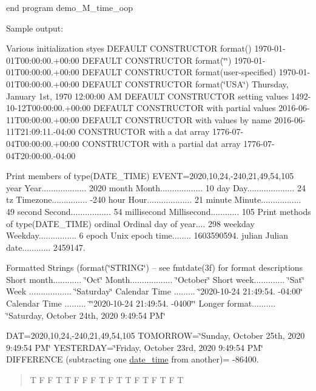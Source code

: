 end program demo\+\_\+\+M\+\_\+time\+\_\+oop

Sample output\+:

Various initialization styes D\+E\+F\+A\+U\+LT C\+O\+N\+S\+T\+R\+U\+C\+T\+OR format() 1970-\/01-\/01\+T00\+:00\+:00.+00\+:00 D\+E\+F\+A\+U\+LT C\+O\+N\+S\+T\+R\+U\+C\+T\+OR format(\char`\"{}\char`\"{}) 1970-\/01-\/01\+T00\+:00\+:00.+00\+:00 D\+E\+F\+A\+U\+LT C\+O\+N\+S\+T\+R\+U\+C\+T\+OR format(user-\/specified) 1970-\/01-\/01\+T00\+:00\+:00.+00\+:00 D\+E\+F\+A\+U\+LT C\+O\+N\+S\+T\+R\+U\+C\+T\+OR format(\char`\"{}\+U\+S\+A\char`\"{}) Thursday, January 1st, 1970 12\+:00\+:00 AM D\+E\+F\+A\+U\+LT C\+O\+N\+S\+T\+R\+U\+C\+T\+OR setting values 1492-\/10-\/12\+T00\+:00\+:00.+00\+:00 D\+E\+F\+A\+U\+LT C\+O\+N\+S\+T\+R\+U\+C\+T\+OR with partial values 2016-\/06-\/11\+T00\+:00\+:00.+00\+:00 D\+E\+F\+A\+U\+LT C\+O\+N\+S\+T\+R\+U\+C\+T\+OR with values by name 2016-\/06-\/11\+T21\+:09\+:11.-\/04\+:00 C\+O\+N\+S\+T\+R\+U\+C\+T\+OR with a dat array 1776-\/07-\/04\+T00\+:00\+:00.+00\+:00 C\+O\+N\+S\+T\+R\+U\+C\+T\+OR with a partial dat array 1776-\/07-\/04\+T20\+:00\+:00.-\/04\+:00

Print members of type(\+D\+A\+T\+E\+\_\+\+T\+I\+M\+E) E\+V\+E\+NT=2020,10,24,-\/240,21,49,54,105 year Year................... 2020 month Month.................. 10 day Day.................... 24 tz Timezone............... -\/240 hour Hour................... 21 minute Minute................. 49 second Second................. 54 millisecond Millisecond............ 105 Print methods of type(\+D\+A\+T\+E\+\_\+\+T\+I\+M\+E) ordinal Ordinal day of year.... 298 weekday Weekday................ 6 epoch Unix epoch time........ 1603590594. julian Julian date............ 2459147.

Formatted Strings (format(\char`\"{}\+S\+T\+R\+I\+N\+G\char`\"{}) -- see fmtdate(3f) for format descriptions Short month............ \char`\"{}\+Oct\char`\"{} Month.................. \char`\"{}\+October\char`\"{} Short week............. \char`\"{}\+Sat\char`\"{} Week .................. \char`\"{}\+Saturday\char`\"{} Calendar Time ......... \char`\"{}2020-\/10-\/24 21\+:49\+:54. -\/04\+:00\char`\"{} Calendar Time ......... \char`\"{}\char`\"{}2020-\/10-\/24 21\+:49\+:54. -\/0400\char`\"{}\char`\"{} Longer format.......... \char`\"{}\+Saturday, October 24th, 2020 9\+:49\+:54 P\+M\char`\"{}

D\+AT=2020,10,24,-\/240,21,49,54,105 T\+O\+M\+O\+R\+R\+OW=\char`\"{}\+Sunday, October 25th, 2020 9\+:49\+:54 P\+M\char`\"{} Y\+E\+S\+T\+E\+R\+D\+AY=\char`\"{}\+Friday, October 23rd, 2020 9\+:49\+:54 P\+M\char`\"{} D\+I\+F\+F\+E\+R\+E\+N\+CE (subtracting one \mbox{\hyperlink{structm__time__oop_1_1date__time}{date\+\_\+time}} from another)= -\/86400. \begin{quote}
T F F T T F F F T F T T F T F T F T \end{quote}


